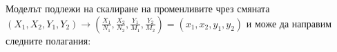 

Моделът подлежи на скалиране на променливите чрез смяната $(X_1, X_2, Y_1, Y_2) \rightarrow (\frac{X_1}{N_1}, \frac{X_2}{N_2}, \frac{Y_1}{M_1}, \frac{Y_2}{M_2}) = (x_1, x_2, y_1, y_2)$ и може да направим следните полагания:

